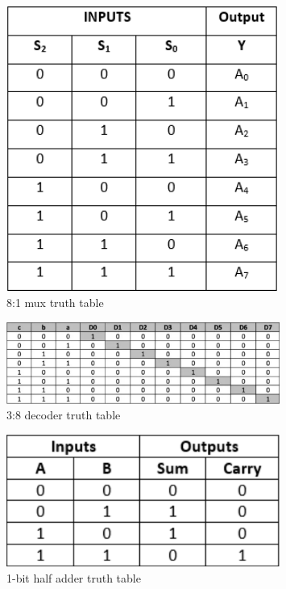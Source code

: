 \documentclass[pdftex,12pt,a4paper]{article}
\begin{document}
    \begin{figure}[H]
    	\centering
    	\includegraphics[width=0.8\textwidth]{truth tables/mux.png}	
    	\caption{8:1 mux truth table}
    	\label{8:1 mux truth table}
    \end{figure}
    
    \begin{figure}[H]
    	\centering
    	\includegraphics[width=0.8\textwidth]{truth tables/decoder.png}	
    	\caption{3:8 decoder truth table}
    	\label{3:8 decoder truth table}
    \end{figure}
    
    \begin{figure}[H]
    	\centering
    	\includegraphics[width=0.8\textwidth]{truth tables/half.png}	
    	\caption{1-bit half adder truth table}
    	\label{1-bit half adder truth table}
    \end{figure}
\end{document}
